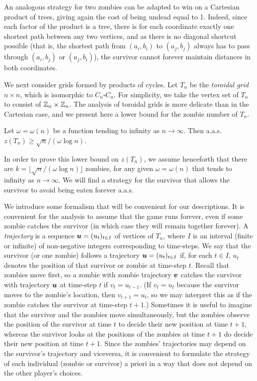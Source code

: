 \documentclass[12pt]{amsart}
\begin{document}
An analogous strategy for two zombies can be adapted to win on a Cartesian product of trees, giving again the cost of being undead equal to 1. Indeed, since each factor of the product is a tree, there is for each
coordinate exactly one shortest path between any two vertices, and as there is no diagonal shortcut possible (that is, the shortest path from $(a_i,b_i)$ to $(a_j,b_j)$ always has to pass through
$(a_i,b_j)$ or $(a_j,b_i)$), the survivor cannot forever maintain distances in both coordinates.

\medskip

We next consider grids formed by products of cycles.  Let $T_n$ be the \emph{toroidal grid} $n\times n$, which is isomorphic to $C_n \square C_n.$ For simplicity, we take the vertex set of $T_n$ to
consist of ${\mathbb Z}_n \times{\mathbb Z}_n$. The analysis of toroidal grids is more delicate than in the Cartesian case, and we present here a lower bound for the zombie number of $T_n.$

\begin{theorem}\label{thm:torus}
Let $\omega = \omega(n)$ be a function tending to infinity as $n\to \infty$. Then a.a.s.\ $z(T_n) \ge \sqrt n/(\omega\log n)$.
\end{theorem}
In order to prove this lower bound on $z(T_n)$, we assume henceforth that there are $k=  \lfloor \sqrt n/(\omega \log n) \rfloor $ zombies, for any given $\omega = \omega(n)$ that tends to infinity as $n\to \infty$. We will find a strategy for the survivor
that allows the survivor to avoid being eaten forever a.a.s.

We introduce some formalism that will be convenient for our descriptions.
It is convenient for the analysis to assume that the game runs
forever, even if some zombie catches the survivor (in which case they will remain together forever).
A \emph{trajectory} is a sequence ${\boldsymbol u}=(u_t)_{t\in I}$ of vertices of $T_n$, where $I$ is an interval (finite or
infinite) of non-negative integers corresponding to time-steps. We say that the survivor (or one zombie) follows a trajectory ${\boldsymbol u}=(u_t)_{t\in I}$ if, for each $t\in I$, $u_t$ denotes the position
of that survivor or zombie at time-step $t$. Recall that zombies move first, so a zombie with zombie trajectory ${\boldsymbol v}$ catches the survivor with trajectory ${\boldsymbol u}$ at time-step $t$ if $v_t=u_{t-1}$.
(If $v_t=u_t$ because the survivor moves to the zombie's location, then $v_{t+1}=u_{t}$, so we may interpret this as if the zombie catches the survivor at time-step $t+1$.)
Sometimes it is useful to imagine that the survivor and the zombies move
simultaneously, but the zombies observe the position of the survivor at time $t$ to decide their new position at time $t+1$, whereas the survivor looks at the positions of the zombies at time $t+1$
do decide their new position at time $t+1$. Since the zombies' trajectories may depend on the survivor's trajectory and viceversa, it is convenient to formulate the strategy of each individual
(zombie or survivor) a priori in a way that does not depend on the other player's choices.
\end{document}
